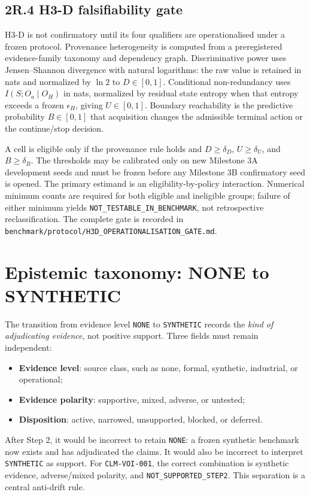 \documentclass[11pt,a4paper]{article}
\begin{document}
\subsection{2R.4 H3-D falsifiability gate}

H3-D is not confirmatory until its four qualifiers are operationalised under a frozen protocol. Provenance heterogeneity is computed from a preregistered evidence-family taxonomy and dependency graph. Discriminative power uses Jensen--Shannon divergence with natural logarithms: the raw value is retained in nats and normalized by $\ln 2$ to $D\in[0,1]$. Conditional non-redundancy uses $I(S;O_a\mid O_H)$ in nats, normalized by residual state entropy when that entropy exceeds a frozen $\epsilon_H$, giving $U\in[0,1]$. Boundary reachability is the predictive probability $B\in[0,1]$ that acquisition changes the admissible terminal action or the continue/stop decision.

A cell is eligible only if the provenance rule holds and $D\geq\delta_D$, $U\geq\delta_U$, and $B\geq\delta_B$. The thresholds may be calibrated only on new Milestone 3A development seeds and must be frozen before any Milestone 3B confirmatory seed is opened. The primary estimand is an eligibility-by-policy interaction. Numerical minimum counts are required for both eligible and ineligible groups; failure of either minimum yields \texttt{NOT\_TESTABLE\_IN\_BENCHMARK}, not retrospective reclassification. The complete gate is recorded in \texttt{benchmark/protocol/H3D\_OPERATIONALISATION\_GATE.md}.

\section{Epistemic taxonomy: NONE to SYNTHETIC}

The transition from evidence level \texttt{NONE} to \texttt{SYNTHETIC} records the \emph{kind of adjudicating evidence}, not positive support. Three fields must remain independent:
\begin{itemize}
  \item \textbf{Evidence level}: source class, such as none, formal, synthetic, industrial, or operational;
  \item \textbf{Evidence polarity}: supportive, mixed, adverse, or untested;
  \item \textbf{Disposition}: active, narrowed, unsupported, blocked, or deferred.
\end{itemize}

After Step 2, it would be incorrect to retain \texttt{NONE}: a frozen synthetic benchmark now exists and has adjudicated the claims. It would also be incorrect to interpret \texttt{SYNTHETIC} as support. For \texttt{CLM-VOI-001}, the correct combination is synthetic evidence, adverse/mixed polarity, and \texttt{NOT\_SUPPORTED\_STEP2}. This separation is a central anti-drift rule.
\end{document}
